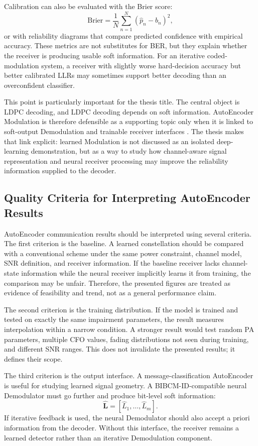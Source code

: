 Calibration can also be evaluated with the Brier score:
\begin{equation}
  \mathrm{Brier}=\frac{1}{N}\sum_{n=1}^{N}(\hat{p}_n-b_n)^2,
\end{equation}
or with reliability diagrams that compare predicted confidence with empirical accuracy. These metrics are not substitutes for BER, but they explain whether the receiver is producing usable soft information. For an iterative coded-modulation system, a receiver with slightly worse hard-decision accuracy but better calibrated LLRs may sometimes support better decoding than an overconfident classifier.

This point is particularly important for the thesis title. The central object is LDPC decoding, and LDPC decoding depends on soft information. AutoEncoder Modulation is therefore defensible as a supporting topic only when it is linked to soft-output Demodulation and trainable receiver interfaces \cite{cammerer2020}. The thesis makes that link explicit: learned Modulation is not discussed as an isolated deep-learning demonstration, but as a way to study how channel-aware signal representation and neural receiver processing may improve the reliability information supplied to the decoder.

\subsection{Quality Criteria for Interpreting AutoEncoder Results}
AutoEncoder communication results should be interpreted using several criteria. The first criterion is the baseline. A learned constellation should be compared with a conventional scheme under the same power constraint, channel model, SNR definition, and receiver information. If the baseline receiver lacks channel-state information while the neural receiver implicitly learns it from training, the comparison may be unfair. Therefore, the presented figures are treated as evidence of feasibility and trend, not as a general performance claim.

The second criterion is the training distribution. If the model is trained and tested on exactly the same impairment parameters, the result measures interpolation within a narrow condition. A stronger result would test random PA parameters, multiple CFO values, fading distributions not seen during training, and different SNR ranges. This does not invalidate the presented results; it defines their scope.

The third criterion is the output interface. A message-classification AutoEncoder is useful for studying learned signal geometry. A BIBCM-ID-compatible neural Demodulator must go further and produce bit-level soft information:
\begin{equation}
  \mathbf{\hat{L}}=[\hat{L}_1,\ldots,\hat{L}_m].
\end{equation}
If iterative feedback is used, the neural Demodulator should also accept a priori information from the decoder. Without this interface, the receiver remains a learned detector rather than an iterative Demodulation component.

